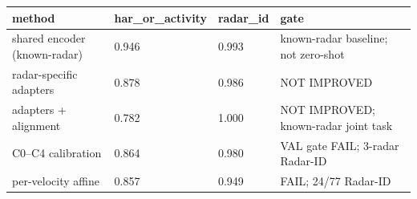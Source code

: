 \begin{tabular}{llll}
\hline
method & har\_or\_activity & radar\_id & gate \\
\hline
shared encoder (known-radar) & 0.946 & 0.993 & known-radar baseline; not zero-shot \\
radar-specific adapters & 0.878 & 0.986 & NOT IMPROVED \\
adapters + alignment & 0.782 & 1.000 & NOT IMPROVED; known-radar joint task \\
C0–C4 calibration & 0.864 & 0.980 & VAL gate FAIL; 3-radar Radar-ID \\
per-velocity affine & 0.857 & 0.949 & FAIL; 24/77 Radar-ID \\
\hline
\end{tabular}

